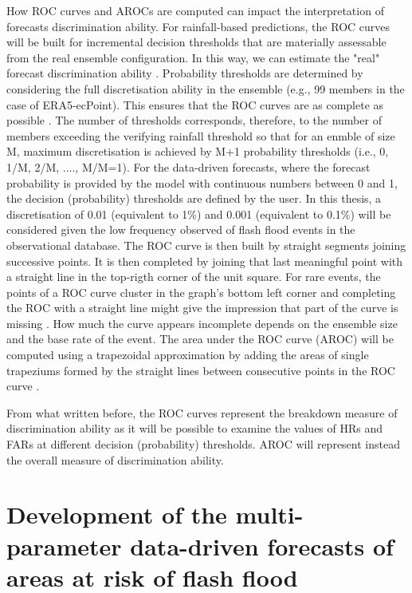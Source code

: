 How ROC curves and AROCs are computed can impact the interpretation of forecasts discrimination ability. For rainfall-based predictions, the ROC curves will be built for incremental decision thresholds that are materially assessable from the real ensemble configuration. In this way, we can estimate the "real" forecast discrimination ability \citep{wilks_statistical_2020}. Probability thresholds are determined by considering the full discretisation ability in the ensemble (e.g., 99 members in the case of ERA5-ecPoint). This ensures that the ROC curves are as complete as possible \citep{Bouallegue_2022}. The number of thresholds corresponds, therefore, to the number of members exceeding the verifying rainfall threshold so that for an enmble of size M, maximum discretisation is achieved by M+1 probability thresholds (i.e., 0, 1/M, 2/M, ...., M/M=1). For the data-driven forecasts, where the forecast probability is provided by the model with continuous numbers between 0 and 1, the decision (probability) thresholds are defined by the user. In this thesis, a discretisation of 0.01 (equivalent to 1\%) and 0.001 (equivalent to 0.1\%) will be considered given the low frequency observed of flash flood events in the observational database. The ROC curve is then built by straight segments joining successive points. It is then completed by joining that last meaningful point with a straight line in the top-rigth corner of the unit square. For rare events, the points of a ROC curve cluster in the graph's bottom left corner and completing the ROC with a straight line might give the impression that part of the curve is missing \citep{Casati_2008}. How much the curve appears incomplete depends on the ensemble size and the base rate of the event. The area under the ROC curve (AROC) will be computed using a trapezoidal approximation by adding the areas of single trapeziums formed by the straight lines between consecutive points in the ROC curve \citep{Bouallegue_2022}. 

From what written before, the ROC curves represent the breakdown measure of discrimination ability as it will be possible to examine the values of HRs and FARs at different decision (probability) thresholds. AROC will represent instead the overall measure of discrimination ability.


\section{Development of the multi-parameter data-driven forecasts of areas at risk of flash flood}

